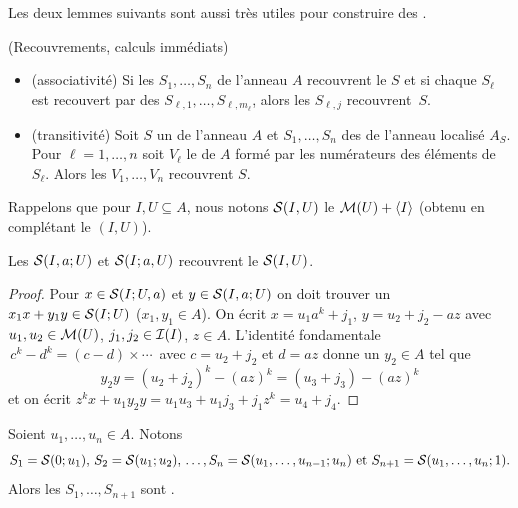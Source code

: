 Les deux lemmes suivants sont aussi très utiles pour construire des 
\moco.
\begin{lemma} 
\label{lemAssoc} (Recouvrements, calculs immédiats)
\begin{itemize}
\item [$(1)$] (associativité) Si les \mos $S_1,\ldots ,S_n$ de l'anneau 
$A$ recouvrent le \mo $S$  et si chaque $S_\ell$ est recouvert par des 
\mos  
$S_{\ell,1},\ldots ,S_{\ell,m_\ell}$, alors les $S_{\ell,j}$ recouvrent~$S$.
\item [$(2)$] (transitivité) Soit  $S$ un \mo de  l'anneau $A$ et 
$S_1,\ldots ,S_n$ des \moco de  l'anneau localisé $A_S$. 
Pour $\ell=1,\ldots,n$ soit $V_\ell$ le \mo
de  $A$ formé par les numérateurs des éléments de  $S_\ell$. 
Alors les \mos $V_1,\ldots ,V_n$ recouvrent  $S$. 
\end{itemize}
\end{lemma}

Rappelons que  pour  $I,U\subseteq A$, nous notons ${\cal S}(I,U)$ le \mo 
\hbox{${\cal M}(U)+\left\langle{I}\right\rangle$}  (obtenu en complétant le \proi $(I,U)$).

\begin{lemma} 
\label{lemRecouvre} 
Les \mos
${\cal S}(I,a;U)$ et ${\cal S}(I;a,U)$ recouvrent le \mo ${\cal S}(I,U)$. 
\end{lemma}
\begin{proof}
Pour  $x\in {\cal S}(I;U,a)$ et  $y\in {\cal S}(I,a;U)$ 
on doit trouver un $x_1x+y_1y\in {\cal S}(I;U)$ ($x_1,y_1\in A$). 
On écrit $x=u_1a^k+j_1$, $y=u_2+j_2-az$ avec $u_1,u_2\in {\cal M}(U)$,
   $j_1,j_2\in {\cal I}(I)$,   $z\in A$. L'identité fondamentale 
$\, c^k-d^k=(c-d)\times \cdots\, $ avec $c=u_2+j_2$ et $d=az$ donne un 
$y_2\in A$  tel que $$y_2y=(u_2+j_2)^k-(az)^k=(u_3+j_3)-(az)^k$$
et on écrit $z^kx+u_1y_2y=u_1u_3+u_1j_3+j_1z^k=u_4+j_4$.
\end{proof}

\begin{corollary} 
\label{corS} Soient $u_1,\ldots,u_n\in A$. 
Notons  
$$
S_1={\cal S}(0;u_1) ,\, S_2={\cal S}(u_1;u_2) ,\, \dots, S_n={\cal S}(u_1,\dots,u_{n-1};u_n)\hbox{ et }
S_{n+1}={\cal S}(u_1,\dots,u_n;1).
$$ 
Alors les \mos $S_1,\ldots,S_{n+1}$ sont \com.
\end{corollary}



